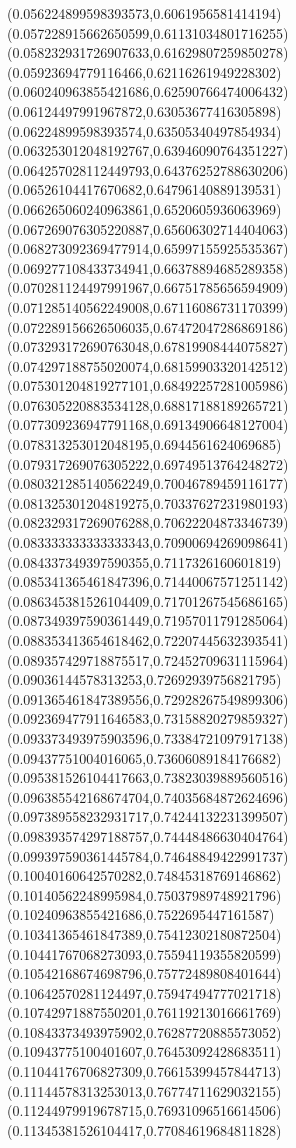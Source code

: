 \documentclass[12pt]{article}
\theoremstyle{plain}
\theoremstyle{definition}
\theoremstyle{remark}
\begin{document}
\begin{figure}
{  (0.056224899598393573,0.6061956581414194)%
  (0.057228915662650599,0.61131034801716255)%
  (0.058232931726907633,0.61629807259850278)%
  (0.05923694779116466,0.62116261949228302)%
  (0.060240963855421686,0.62590766474006432)%
  (0.06124497991967872,0.63053677416305898)%
  (0.06224899598393574,0.63505340497854934)%
  (0.063253012048192767,0.63946090764351227)%
  (0.064257028112449793,0.64376252788630206)%
  (0.06526104417670682,0.64796140889139531)%
  (0.066265060240963861,0.6520605936063969)%
  (0.067269076305220887,0.65606302714404063)%
  (0.068273092369477914,0.65997155925535367)%
  (0.069277108433734941,0.66378894685289358)%
  (0.070281124497991967,0.66751785656594909)%
  (0.071285140562249008,0.67116086731170399)%
  (0.072289156626506035,0.67472047286869186)%
  (0.073293172690763048,0.67819908444075827)%
  (0.074297188755020074,0.68159903320142512)%
  (0.075301204819277101,0.68492257281005986)%
  (0.076305220883534128,0.68817188189265721)%
  (0.077309236947791168,0.69134906648127004)%
  (0.078313253012048195,0.6944561624069685)%
  (0.079317269076305222,0.69749513764248272)%
  (0.080321285140562249,0.70046789459116177)%
  (0.081325301204819275,0.70337627231980193)%
  (0.082329317269076288,0.70622204873346739)%
  (0.083333333333333343,0.70900694269098641)%
  (0.084337349397590355,0.7117326160601819)%
  (0.085341365461847396,0.71440067571251142)%
  (0.086345381526104409,0.71701267545686165)%
  (0.087349397590361449,0.71957011791285064)%
  (0.088353413654618462,0.72207445632393541)%
  (0.089357429718875517,0.72452709631115964)%
  (0.09036144578313253,0.72692939756821795)%
  (0.091365461847389556,0.72928267549899306)%
  (0.092369477911646583,0.73158820279859327)%
  (0.093373493975903596,0.73384721097917138)%
  (0.09437751004016065,0.73606089184176682)%
  (0.095381526104417663,0.73823039889560516)%
  (0.096385542168674704,0.74035684872624696)%
  (0.097389558232931717,0.74244132231399507)%
  (0.098393574297188757,0.74448486630404764)%
  (0.099397590361445784,0.74648849422991737)%
  (0.10040160642570282,0.74845318769146862)%
  (0.10140562248995984,0.75037989748921796)%
  (0.10240963855421686,0.7522695447161587)%
  (0.10341365461847389,0.75412302180872504)%
  (0.10441767068273093,0.75594119355820599)%
  (0.10542168674698796,0.75772489808401644)%
  (0.10642570281124497,0.75947494777021718)%
  (0.10742971887550201,0.76119213016661769)%
  (0.10843373493975902,0.76287720885573052)%
  (0.10943775100401607,0.76453092428683511)%
  (0.11044176706827309,0.76615399457844713)%
  (0.11144578313253013,0.76774711629032155)%
  (0.11244979919678715,0.76931096516614506)%
  (0.11345381526104417,0.77084619684811828)%
}
\end{figure}
\end{document}
